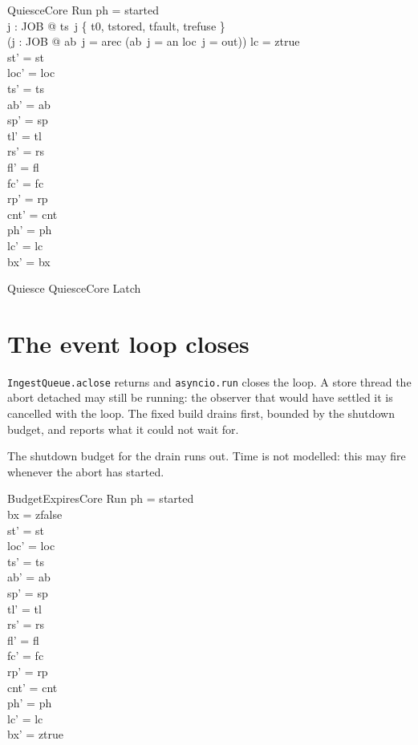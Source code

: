 \documentclass[a4paper,10pt,fleqn]{article}
\newcommand{\field}[1]{\texttt{#1}}
\begin{document}
\begin{schema}{QuiesceCore}
\Delta Run
\where
ph = started \\
\forall j : JOB @ ts~j \in \{ t0, tstored, tfault, trefuse \} \\
(\forall j : JOB @ ab~j = arec \lor (ab~j = an \land loc~j = out)) \lor lc = ztrue \\
st' = st \\
loc' = loc \\
ts' = ts \\
ab' = ab \\
sp' = sp \\
tl' = tl \\
rs' = rs \\
fl' = fl \\
fc' = fc \\
rp' = rp \\
cnt' = cnt \\
ph' = ph \\
lc' = lc \\
bx' = bx
\end{schema}

\begin{zed}
Quiesce  QuiesceCore \land Latch
\end{zed}


\section{The event loop closes}
\label{sec:close}

\field{IngestQueue.aclose} returns and \field{asyncio.run} closes the loop. A store
thread the abort detached may still be running: the observer that would have
settled it is cancelled with the loop. The fixed build drains first, bounded by
the shutdown budget, and reports what it could not wait for.

The shutdown budget for the drain runs out. Time is not modelled: this may fire
whenever the abort has started.

\begin{schema}{BudgetExpiresCore}
\Delta Run
\where
ph = started \\
bx = zfalse \\
st' = st \\
loc' = loc \\
ts' = ts \\
ab' = ab \\
sp' = sp \\
tl' = tl \\
rs' = rs \\
fl' = fl \\
fc' = fc \\
rp' = rp \\
cnt' = cnt \\
ph' = ph \\
lc' = lc \\
bx' = ztrue
\end{schema}
\end{document}

